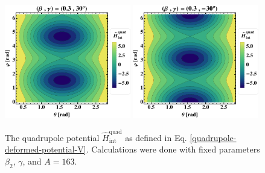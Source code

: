 \begin{figure}
    \centering
    \includegraphics[width=0.49\textwidth]{Chapters/Figures/quadrupole-potentialV-3.pdf}
    \includegraphics[width=0.49\textwidth]{Chapters/Figures/quadrupole-potentialV-4.pdf}
    \caption{The quadrupole potential $\hat{H}_\text{int}^\text{quad}$ as defined in Eq. \eqref{quadrupole-deformed-potential-V}. Calculations were done with fixed parameters $\beta_2$, $\gamma$, and $A=163$.}
    \label{figs-deformed-quadrupole-potential-2}
\end{figure}

